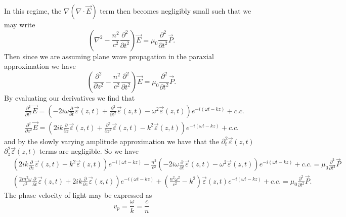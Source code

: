 \documentclass[aps,pra,showpacs,amsmath,amssymb,nofootinbib,longbibliography,superscriptaddress
]{revtex4-1}
\theoremstyle{definition}
\theoremstyle{remark}
\newcommand{\0}{\hat{0}}
\begin{document}
In this regime, the $\nabla \left( \nabla \cdot \vec{E} \right)$ term then becomes negligibly small such that we may write~\cite{Nonlinear}
\begin{equation}
    \left(\nabla^2 - \frac{n^2}{c^2} \frac{\partial^2}{\partial t^2}\right) \vec{E} = \mu_0 \frac{\partial^2}{\partial t^2} \vec{P}.
\end{equation}
Then since we are assuming plane wave propagation in the paraxial approximation we have
\begin{equation}
    \left(\frac{\partial^2}{\partial z^2} - \frac{n^2}{c^2} \frac{\partial^2}{\partial t^2}\right) \vec{E} = \mu_0 \frac{\partial^2}{\partial t^2} \vec{P}.
\end{equation}
By evaluating our derivatives we find that
\begin{align}
   &\frac{\partial^2}{\partial t^2} \vec{E} = \left(-2 i \omega \frac{\partial}{\partial t} \vec{\varepsilon}(z, t) + \frac{\partial^2}{\partial t^2}\vec{\varepsilon}(z, t) - \omega^2 \vec{\varepsilon}(z, t)\right) e^{-i (\omega t - kz)} + c.c.\\
   &\frac{\partial^2}{\partial z^2} \vec{E} = \left(2 i k \frac{\partial}{\partial z} \vec{\varepsilon}(z, t) + \frac{\partial^2}{\partial z^2}\vec{\varepsilon}(z, t) - k^2 \vec{\varepsilon}(z, t)\right) e^{-i (\omega t - kz)} + c.c.
\end{align}
and by the slowly varying amplitude approximation we have that the $\partial_t^2 \vec{\varepsilon}(z, t)$ $\partial_z^2 \vec{\varepsilon}(z, t)$ terms are negligible. So we have
\begin{align}
    &\left(2 i k \frac{\partial}{\partial z} \vec{\varepsilon}(z, t) - k^2 \vec{\varepsilon}(z, t)\right) e^{-i (\omega t - kz)}
    - \frac{n^2}{c^2} \left(-2 i \omega \frac{\partial}{\partial t} \vec{\varepsilon}(z, t) - \omega^2 \vec{\varepsilon}(z, t)\right) e^{-i (\omega t - kz)} + c.c. = \mu_0 \frac{\partial^2}{\partial t^2} \vec{P} \nonumber\\
    &\left(\frac{2 i n^2 \omega}{c^2} \frac{\partial}{\partial t} \vec{\varepsilon}(z, t) + 2 i k \frac{\partial}{\partial z} \vec{\varepsilon}(z, t) \right)e^{-i (\omega t - kz)} + \left(\frac{n^2 \omega^2}{c^2} - k^2 \right) \vec{\varepsilon}(z, t) e^{-i (\omega t - kz)} + c.c. = \mu_0 \frac{\partial^2}{\partial t^2} \vec{P}. \nonumber
\end{align}
The phase velocity of light may be expressed as
\begin{equation}
    v_p = \frac{\omega}{k} = \frac{c}{n}
\end{equation}
\end{document}

